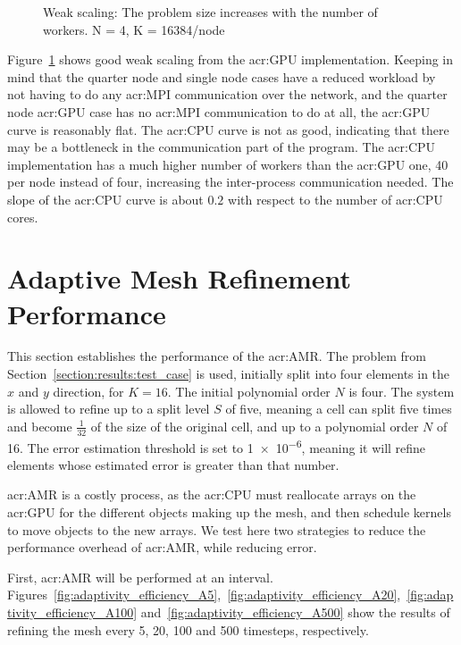 \begin{figure}[H]
	\centering
	
	\caption{Weak scaling: The problem size increases with the number of workers. N = 4, K = 16384/node}\label{fig:weak_scaling}
\end{figure}

Figure~\ref{fig:weak_scaling} shows good weak scaling from the \acrshort{acr:GPU} implementation.
Keeping in mind that the quarter node and single node cases have a reduced workload by not having to
do any \acrshort{acr:MPI} communication over the network, and the quarter node \acrshort{acr:GPU}
case has no \acrshort{acr:MPI} communication to do at all, the \acrshort{acr:GPU} curve is
reasonably flat. The \acrshort{acr:CPU} curve is not as good, indicating that there may be a
bottleneck in the communication part of the program. The \acrshort{acr:CPU} implementation has a
much higher number of workers than the \acrshort{acr:GPU} one, 40 per node instead of four,
increasing the inter-process communication needed. The slope of the \acrshort{acr:CPU} curve is
about \(0.2\) with respect to the number of \acrshort{acr:CPU} cores. 

\section{Adaptive Mesh Refinement Performance}\label{section:results:adaptivity_performance}

This section establishes the performance of the \acrlong{acr:AMR}. The problem from
Section~\ref{section:results:test_case} is used, initially split into four elements in the \(x\) and
\(y\) direction, for \(K = 16\). The initial polynomial order \(N\) is four. The system is allowed
to refine up to a split level \(S\) of five, meaning a cell can split five times and become \(
\frac{1}{32}\) of the size of the original cell, and up to a polynomial order \(N\) of 16. The error
estimation threshold is set to \num{1e-6}, meaning it will refine elements whose estimated error is
greater than that number.

\Acrlong{acr:AMR} is a costly process, as the \acrshort{acr:CPU} must reallocate arrays on the
\acrshort{acr:GPU} for the different objects making up the mesh, and then schedule kernels to move
objects to the new arrays. We test here two strategies to reduce the performance overhead of
\acrlong{acr:AMR}, while reducing error. 

First, \acrlong{acr:AMR} will be performed at an interval.
Figures~\ref{fig:adaptivity_efficiency_A5},~\ref{fig:adaptivity_efficiency_A20},~\ref{fig:adaptivity_efficiency_A100}
and~\ref{fig:adaptivity_efficiency_A500} show the results of refining the mesh every 5, 20, 100 and
500 timesteps, respectively.

